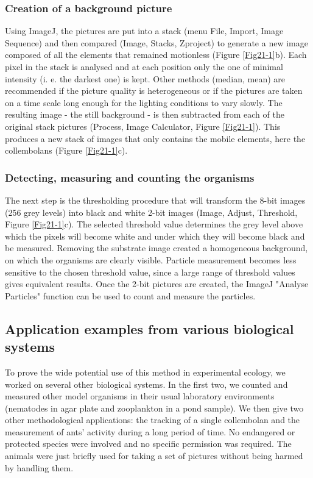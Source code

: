 \subsubsection{Creation of a background picture}

Using ImageJ, the pictures are put into a stack (menu File, Import, Image
Sequence) and then compared (Image, Stacks, Zproject) to generate a new image
composed of all the elements that remained motionless (Figure \ref{Fig21-1}b). Each pixel in
the stack is analysed and at each position only the one of minimal intensity (i.
e. the darkest one) is kept. Other methods (median, mean) are recommended if the
picture quality is heterogeneous or if the pictures are taken on a time scale
long enough for the lighting conditions to vary slowly. The resulting image -
the still background - is then subtracted from each of the original stack
pictures (Process, Image Calculator, Figure \ref{Fig21-1}). This produces a new stack of
images that only contains the mobile elements, here the collembolans (Figure
\ref{Fig21-1}c).

\subsubsection{Detecting, measuring and counting the organisms}

The next step is the thresholding procedure that will transform the 8-bit
images (256 grey levels) into black and white 2-bit images (Image, Adjust,
Threshold, Figure \ref{Fig21-1}c). The selected threshold value determines the grey level
above which the pixels will become white and under which they will become black
and be measured. Removing the substrate image created a homogeneous background,
on which the organisms are clearly visible. Particle measurement becomes less
sensitive to the chosen threshold value, since a large range of threshold values
gives equivalent results. Once the 2-bit pictures are created, the ImageJ
"Analyse Particles" function can be used to count and measure the particles.

\subsection{Application examples from various biological systems}

To prove the wide potential use of this method in experimental ecology, we
worked on several other biological systems. In the first two, we counted and
measured other model organisms in their usual laboratory environments (nematodes
in agar plate and zooplankton in a pond sample). We then give two other
methodological applications: the tracking of a single collembolan and the
measurement of ants’ activity during a long period of time. No endangered or
protected species were involved and no specific permission was required. The
animals were just briefly used for taking a set of pictures without being harmed
by handling them.

